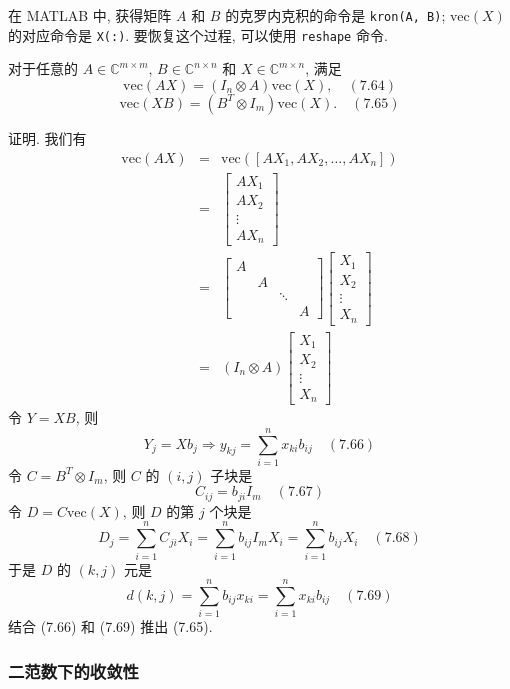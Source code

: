 \documentclass[a4paper]{ctexart}
\newcommand{\hl}[1]
{\noindent {\bf {#1}}}
\begin{document}
{在 MATLAB 中, 获得矩阵 $A$ 和 $B$ 的克罗内克积的命令是 \verb|kron(A, B)|; 
$\mathrm{vec}(X)$ 的对应命令是 \verb|X(:)|. 
要恢复这个过程, 可以使用 \verb|reshape| 命令.

\hl{引理 7.47} 对于任意的 $A \in \mathbb{C}^{m \times m}$, 
$B \in \mathbb{C}^{n \times n}$ 和 
$X \in \mathbb{C}^{m \times n}$, 满足
$$
\mathrm{vec}(AX) = (I_n \otimes A)\mathrm{vec}(X), \quad (7.64) 
$$
$$
\mathrm{vec}(XB) = (B^T \otimes I_m)\mathrm{vec}(X). \quad (7.65) 
$$

证明. 我们有
\begin{eqnarray*}
\mathrm{vec}(AX) &=& \mathrm{vec}([AX_1, AX_2, \ldots, AX_n]) \\
&=&
\begin{bmatrix}
AX_1 \\
AX_2 \\
\vdots \\
AX_n
\end{bmatrix} \\
&=&
\begin{bmatrix}
A &&&\\
 & A&&\\
 & & \ddots&\\
 & & & A
\end{bmatrix} 
\begin{bmatrix}
X_1 \\
X_2 \\
\vdots \\
X_n
\end{bmatrix}\\
&=& (I_n \otimes A)
\begin{bmatrix}
X_1 \\
X_2 \\
\vdots \\
X_n
\end{bmatrix}
\end{eqnarray*}
令 $Y = XB$, 则
$$
Y_j = Xb_j \Rightarrow y_{kj} = \sum_{i = 1}^{n} x_{ki}b_{ij} \quad (7.66) 
$$
令 $C = B^T \otimes I_m$, 则 $C$ 的 $(i, j)$ 子块是
$$
 C_{ij} = b_{ji}I_m \quad (7.67) 
$$
令 $D = C\mathrm{vec}(X)$, 则 $D$ 的第 $j$ 个块是
$$
D_j = \sum_{i = 1}^{n} C_{ji}X_i 
= \sum_{i=1}^{n} b_{ij} I_m X_i = \sum_{i=1}^{n} b_{ij}X_i \quad (7.68) 
$$
于是 $D$ 的 $(k, j)$ 元是
$$
d(k,j) = \sum_{i = 1}^{n} b_{ij}x_{ki} 
= \sum_{i=1}^{n} x_{ki}b_{ij} \quad (7.69) 
$$
结合 (7.66) 和 (7.69) 推出 (7.65).

\subsubsection{二范数下的收敛性}

}
\end{document}
